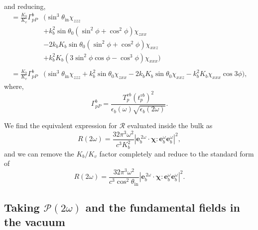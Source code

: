 and reducing,
\begin{equation*}
\begin{split}
=
\frac{K_{b}}{K_{v}}
\Gamma^{b}_{pP}
&\big(
   \sin^{3}\theta_{\mathrm{in}}\chi_{zzz}\\
&+ k^{2}_{b}\sin\theta_{0}(\sin^{2}\phi + \cos^{2}\phi)\chi_{zxx}\\
&- 2k_{b}K_{b}\sin\theta_{0}(\sin^{2}\phi + \cos^{2}\phi)\chi_{xxz}\\
&+ k^{2}_{b}K_{b}(3\sin^{2}\phi\cos\phi - \cos^{3}\phi)\chi_{xxx}
\big)\\\\
=
\frac{K_{b}}{K_{v}}
\Gamma^{b}_{pP}
&\big(
  \sin^{3}\theta_{\mathrm{in}}\chi_{zzz} 
+ k^{2}_{b}\sin\theta_{0}\chi_{zxx}
- 2k_{b}K_{b}\sin\theta_{0}\chi_{xxz}
- k^{2}_{b}K_{b}\chi_{xxx}\cos3\phi
\big),
\end{split}
\end{equation*}
where,
\begin{equation*}
\Gamma^{b}_{pP} =
\frac{T_{p}^{vb}\left(t^{vb}_{p}\right)^{2}}
     {\epsilon_{b}(\omega)\sqrt{\epsilon_{b}(2\omega)}}.
\end{equation*}

We find the equivalent expression for $\mathcal{R}$ evaluated inside the bulk
as
\begin{equation*}
R(2\omega) =
\frac{32\pi^{3} \omega^{2}}{c^{3}K^{2}_{b}}
\left\vert
\mathbf{e}^{\,2\omega}_{b}\cdot\boldsymbol{\chi}:
\mathbf{e}^{\omega}_{b}\mathbf{e}^{\omega}_{b}
\right\vert^{2} 
,
\end{equation*}
and we can remove the $K_{b}/K_{v}$ factor completely and reduce to the
standard form of
\begin{equation*}
R(2\omega) =
\frac{32\pi^{3} \omega^{2}}{c^{3}\cos^{2}\theta_{\mathrm{in}}}
\left\vert
\mathbf{e}^{\,2\omega}_{b}\cdot\boldsymbol{\chi}:
\mathbf{e}^{\omega}_{b}\mathbf{e}^{\omega}_{b}
\right\vert^{2}.
\end{equation*}


\subsection{Taking \texorpdfstring{$\mathcal{P}(2\omega)$}{P(2w)} and the
fundamental fields in the vacuum}

